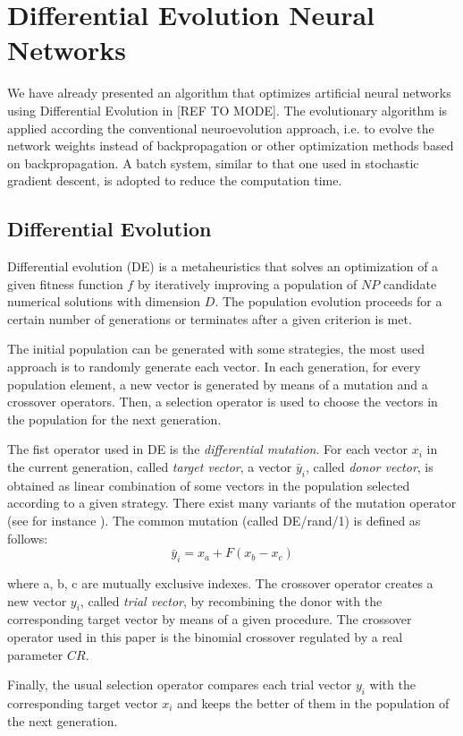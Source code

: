 \section{Differential Evolution Neural Networks} \label{denn}
We have already presented an algorithm that optimizes artificial neural networks using Differential Evolution in [REF TO MODE]. 
The evolutionary algorithm is applied according the conventional neuroevolution approach, i.e. to evolve the network weights instead of backpropagation or other optimization methods based on backpropagation. A batch system, similar to that one used in stochastic gradient descent, is adopted to reduce the computation time.

\subsection{Differential Evolution}
Differential evolution (DE) is a metaheuristics that solves an optimization of a given fitness function $f$ by iteratively improving a population of $NP$ candidate numerical solutions with dimension $D$.
The population evolution proceeds for a certain number of generations or terminates after a given criterion is met.

The initial population can be generated with some strategies, the most used approach is to randomly generate each vector.
In each generation, for every population element, a new vector is generated by means of a mutation and a crossover operators.
Then, a selection operator is used to choose the vectors in the population for the next generation. 

The fist operator used in DE is the {\it differential mutation}. For each vector $x_i$ in the current generation, called {\it target vector}, a vector $\bar y_i$, called {\it donor vector}, is obtained as linear combination of some vectors in the population selected according
to a given strategy.
There exist many variants of the mutation operator (see for instance \cite{surveyDE_2011,surveyDE_2016}). 
The common mutation (called DE/rand/1) is defined as follows:
$$\bar y_i = x_a + F(x_b - x_c)$$

where a, b, c are mutually exclusive indexes.
The crossover operator creates a new vector $y_i$, called {\it trial vector}, by recombining the donor with the corresponding target vector by means of a given procedure. The crossover operator used in this paper is the binomial crossover regulated by a real parameter $CR$.

Finally, the usual selection operator compares each trial vector $y_i$ with the corresponding target vector $x_i$ and keeps the better of them in the population of the next generation.

